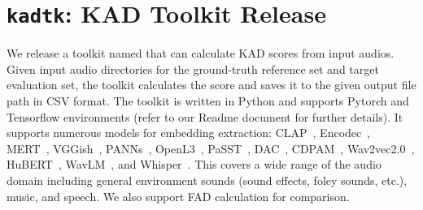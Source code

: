 




\section{\texttt{kadtk}: KAD Toolkit Release}
\label{sec:kadtk_release}
We release a toolkit named  that can calculate KAD scores from input audios. Given input audio directories for the ground-truth reference set and target evaluation set, the toolkit calculates the score and saves it to the given output file path in CSV format. The toolkit is written in Python and supports Pytorch and Tensorflow environments (refer to our Readme document for further details). It supports numerous models for embedding extraction: CLAP~\cite{clap_ms,clap_laion}, Encodec~\cite{encodec}, MERT~\cite{mert}, VGGish~\cite{vggish}, PANNs~\cite{panns}, OpenL3~\cite{openl3}, PaSST~\cite{passt}, DAC~\cite{dac}, CDPAM~\cite{cdpam}, Wav2vec2.0~\cite{wav2vec2.0}, HuBERT~\cite{hubert}, WavLM~\cite{wavlm}, and Whisper~\cite{whisper}. This covers a wide range of the audio domain including general environment sounds (sound effects, foley sounds, etc.), music, and speech. We also support FAD calculation for comparison.

